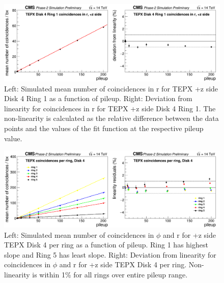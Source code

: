\begin{figure}[H]
  \centering
  \includegraphics[width=1\columnwidth]{./coincidencesinrD4R1z+.png}
  \caption{Left: Simulated mean number of coincidences in r for TEPX +z side Disk 4 Ring 1 as a function of pileup. Right: Deviation from linearity for coincidences in r for TEPX +z side Disk 4 Ring 1. The non-linearity is calculated as the relative difference between the data points and the values of the fit function at the respective pileup value.}
  \label{fig:CMS}
\end{figure}





\begin{figure}[H]
  \centering
  \includegraphics[width=1\columnwidth]{./coincidencesperringD+4.png}
  \caption{Left: Simulated mean number of coincidences in $\phi$ and r for +z side TEPX Disk 4 per ring as a function of pileup. Ring 1 has highest slope and Ring 5 has least slope. Right: Deviation from linearity for coincidences in $\phi$ and r for +z side TEPX Disk 4 per ring. Non-linearity is within 1\% for all rings over entire pileup range.}
  \label{fig:CMS}
\end{figure}








